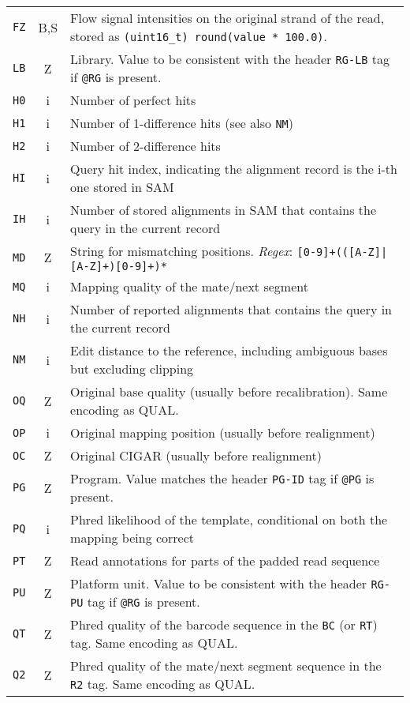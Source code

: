\documentclass[10pt]{article}
\begin{document}
\begin{center}
\begin{tabular}{ccp{12.5cm}}
  {\tt FZ} & B,S & Flow signal intensities on the original strand of the read, stored as {\tt (uint16\_t) round(value * 100.0)}. \\
  {\tt LB} & Z & Library. Value to be consistent with the header {\tt RG-LB} tag if {\tt @RG} is present.\\
  {\tt H0} & i & Number of perfect hits\\
  {\tt H1} & i & Number of 1-difference hits (see also {\tt NM})\\
  {\tt H2} & i & Number of 2-difference hits \\
  {\tt HI} & i & Query hit index, indicating the alignment record is the i-th one stored in SAM\\
  {\tt IH} & i & Number of stored alignments in SAM that contains the query in the current record\\
  {\tt MD} & Z & String for mismatching positions. \emph{Regex}: {\tt [0-9]+(([A-Z]|\char92\char94[A-Z]+)[0-9]+)*}\footnotemark[2]\\
  {\tt MQ} & i & Mapping quality of the mate/next segment \\
  {\tt NH} & i & Number of reported alignments that contains the query in the current record\\
  {\tt NM} & i & Edit distance to the reference, including ambiguous bases but excluding clipping\\
  {\tt OQ} & Z & Original base quality (usually before recalibration). Same encoding as {\sf QUAL}.\\
  {\tt OP} & i & Original mapping position (usually before realignment) \\
  {\tt OC} & Z & Original CIGAR (usually before realignment) \\
  {\tt PG} & Z & Program. Value matches the header {\tt PG-ID} tag if {\tt @PG} is present. \\
  {\tt PQ} & i & Phred likelihood of the template, conditional on both the mapping being correct \\
  {\tt PT} & Z & Read annotations for parts of the padded read sequence\footnotemark[4]\\
  {\tt PU} & Z & Platform unit. Value to be consistent with the header {\tt RG-PU} tag if {\tt @RG} is present.\\
  {\tt QT} & Z & Phred quality of the barcode sequence in the {\tt BC} (or {\tt RT}) tag. Same encoding as {\sf QUAL}. \\
  {\tt Q2} & Z & Phred quality of the mate/next segment sequence in the {\tt R2} tag. Same encoding as {\sf QUAL}.\\

\end{tabular}
\end{center}
\end{document}
